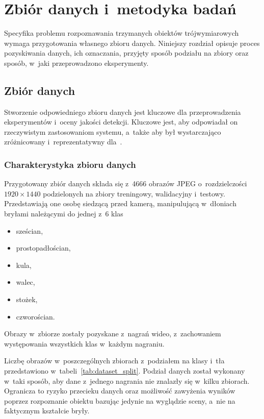 \chapter{Zbiór danych i~metodyka badań}
\label{c:zbior}

Specyfika problemu rozpoznawania trzymanych obiektów trójwymiarowych wymaga przygotowania własnego zbioru danych. Niniejszy rozdział opisuje proces pozyskiwania danych, ich oznaczania, przyjęty sposób podziału na zbiory oraz sposób, w~jaki przeprowadzono eksperymenty.

\section{Zbiór danych}

Stworzenie odpowiedniego zbioru danych jest kluczowe dla przeprowadzenia eksperymentów i~oceny jakości detekcji. Kluczowe jest, aby odpowiadał on rzeczywistym zastosowaniom systemu, a~także aby był wystarczająco zróżnicowany i~reprezentatywny dla~.

\subsection{Charakterystyka zbioru danych}

Przygotowany zbiór danych składa się z~4666 obrazów JPEG o~rozdzielczości $1920\times1440$ podzielonych na zbiory treningowy, walidacyjny i~testowy. Przedstawiają one osobę siedzącą przed kamerą, manipulującą w~dłoniach bryłami należącymi do jednej z~6 klas~
\begin{itemize}
    \item sześcian,
    \item prostopadłościan,
    \item kula,
    \item walec,
    \item stożek,
    \item czworościan.
\end{itemize}
Obrazy w~zbiorze zostały pozyskane z~nagrań wideo, z~zachowaniem występowania wszystkich klas w~każdym nagraniu.

Liczbę obrazów w~poszczególnych zbiorach z~podziałem na klasy i~tła przedstawiono w~tabeli~\ref{tab:dataset_split}. Podział danych został wykonany w~taki sposób, aby dane z~jednego nagrania nie znalazły się w~kilku zbiorach. Ogranicza to ryzyko przecieku danych oraz możliwość zawyżenia wyników poprzez rozpoznanie obiektu bazując jedynie na wyglądzie sceny, a~nie na faktycznym kształcie bryły.

